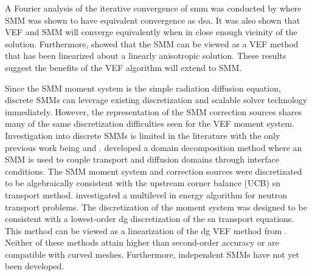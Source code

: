 \documentclass[../doc.tex]{subfiles}
\begin{document}
A Fourier analysis of the iterative convergence of \gls{smm} was conducted by \textcite{cefus} where SMM was shown to have equivalent convergence as \gls{dsa}. It was also shown that VEF and SMM will converge equivalently when in close enough vicinity of the solution. Furthermore, \textcite{cefus} showed that the SMM can be viewed as a VEF method that has been linearized about a linearly anisotropic solution. These results suggest the benefits of the VEF algorithm will extend to SMM. 

Since the SMM moment system is the simple radiation diffusion equation, discrete SMMs can leverage existing discretization and scalable solver technology immediately. However, the representation of the SMM correction sources shares many of the same discretization difficulties seen for the VEF moment system. Investigation into discrete SMMs is limited in the literature with the only previous work being \textcite{STEHLE2014325} and \textcite{https://doi.org/10.48550/arxiv.2102.09054}. \textcite{STEHLE2014325} developed a domain decomposition method where an SMM is used to couple transport and diffusion domains through interface conditions. The SMM moment system and correction sources were discretizated to be algebraically consistent with the upstream corner balance (UCB) \cite{ucb_maginot} \gls{sn} transport method. 
\textcite{https://doi.org/10.48550/arxiv.2102.09054} investigated a multilevel in energy algorithm for neutron transport problems. The discretization of the moment system was designed to be consistent with a lowest-order \gls{dg} discretization of the \gls{sn} transport equations. This method can be viewed as a linearization of the \gls{dg} VEF method from \cite{dima_dfem}. 
Neither of these methods attain higher than second-order accuracy or are compatible with curved meshes. Furthermore, independent SMMs have not yet been developed. 
\end{document}

